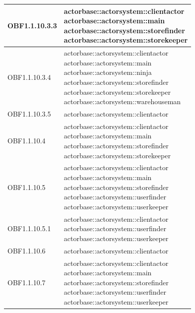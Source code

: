 \documentclass{scalatekids-article}
\begin{document}
\begin{longtable}[H]{|p{6cm}|p{11cm}|}
\hline
OBF1.1.10.3.3 & \multiLineCell[t]{actorbase::actorsystem::clientactor\\actorbase::actorsystem::main\\actorbase::actorsystem::storefinder\\actorbase::actorsystem::storekeeper\\}\\
\hline
OBF1.1.10.3.4 & \multiLineCell[t]{actorbase::actorsystem::clientactor\\actorbase::actorsystem::main\\actorbase::actorsystem::ninja\\actorbase::actorsystem::storefinder\\actorbase::actorsystem::storekeeper\\actorbase::actorsystem::warehouseman\\}\\
\hline
OBF1.1.10.3.5 & \multiLineCell[t]{actorbase::actorsystem::clientactor\\}\\
\hline
OBF1.1.10.4 & \multiLineCell[t]{actorbase::actorsystem::clientactor\\actorbase::actorsystem::main\\actorbase::actorsystem::storefinder\\actorbase::actorsystem::storekeeper\\}\\
\hline
OBF1.1.10.5 & \multiLineCell[t]{actorbase::actorsystem::clientactor\\actorbase::actorsystem::main\\actorbase::actorsystem::storefinder\\actorbase::actorsystem::userfinder\\actorbase::actorsystem::userkeeper\\}\\
\hline
OBF1.1.10.5.1 & \multiLineCell[t]{actorbase::actorsystem::clientactor\\actorbase::actorsystem::userfinder\\actorbase::actorsystem::userkeeper\\}\\
\hline
OBF1.1.10.6 & \multiLineCell[t]{actorbase::actorsystem::clientactor\\}\\
\hline
OBF1.1.10.7 & \multiLineCell[t]{actorbase::actorsystem::clientactor\\actorbase::actorsystem::main\\actorbase::actorsystem::storefinder\\actorbase::actorsystem::userfinder\\actorbase::actorsystem::userkeeper\\}\\

\end{longtable}
\end{document}
